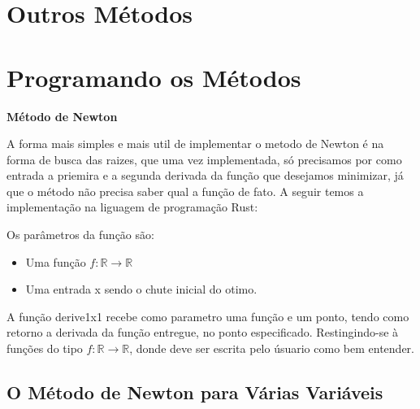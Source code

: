 \section{{Outros Métodos}}

\hspace{0.8cm}

\section{{Programando os Métodos}}

\hspace{0.8cm}

\textbf{Método de Newton}

A forma mais simples e mais util de implementar o metodo de Newton é na forma
de busca das raizes, que uma vez  implementada, só precisamos por como entrada
a priemira e a segunda derivada da função que desejamos minimizar, já que o
método não precisa saber qual a função de fato. A seguir temos a implementação
na liguagem de programação Rust:



Os parâmetros da função são:

    \begin{itemize}
            \item Uma função \(f : \mathbb{R} \rightarrow \mathbb{R}\)
            \item Uma entrada x sendo o chute inicial do otimo.
    \end{itemize}


A função derive1x1 recebe como parametro uma função e um ponto, tendo como
retorno a derivada da função entregue, no ponto especificado. Restingindo-se
à funções do tipo \(f : \mathbb{R} \rightarrow \mathbb{R}\), donde deve ser
escrita pelo úsuario como bem entender.



\textcolor[rgb]{1,0,0}{\section{{O Método de Newton para Várias Variáveis}}}
